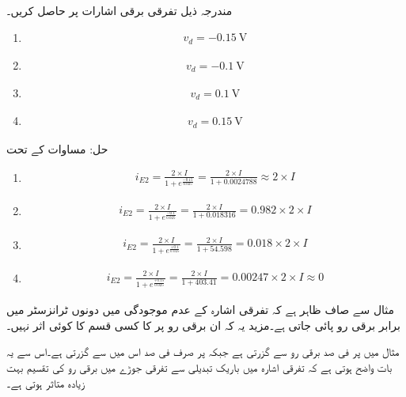  
مندرجہ ذیل تفرقی برقی اشارات پر  حاصل کریں۔
\begin{enumerate}
\item
\begin{align*}
v_d=\SI{-0.15}{\volt}
\end{align*}
\item
\begin{align*}
v_d=\SI{-0.1}{\volt}
\end{align*}
\item
\begin{align*}
v_d=\SI{+0.1}{\volt}
\end{align*}
\item
\begin{align*}
v_d=\SI{+0.15}{\volt}
\end{align*}
\end{enumerate}

حل:	مساوات   کے تحت
\begin{enumerate}
\item
\begin{align*}
i_{E2}=\frac{2 \times I}{1+e^{\frac{-0.15}{0.025}}}=\frac{2 \times I}{1+0.0024788} \approx 2 \times I
\end{align*}
\item
\begin{align*}
i_{E2}=\frac{2 \times I}{1+e^{\frac{-0.1}{0.025}}}=\frac{2 \times I}{1+0.018316} = 0.982 \times  2 \times I
\end{align*}
\item
\begin{align*}
i_{E2}=\frac{2 \times I}{1+e^{\frac{+0.1}{0.025}}}=\frac{2 \times I}{1+54.598} =0.018 \times  2 \times I
\end{align*}
\item
\begin{align*}
i_{E2}=\frac{2 \times I}{1+e^{\frac{+0.15}{0.025}}}=\frac{2 \times I}{1+403.41} =0.00247 \times  2 \times I \approx 0
\end{align*}
\end{enumerate}

مثال   سے صاف ظاہر ہے کہ تفرقی اشارہ کے عدم موجودگی میں دونوں ٹرانزسٹر میں برابر برقی رو پائی جاتی ہے۔مزید یہ کہ ان برقی رو پر   کا کسی قسم کا کوئی اثر نہیں۔

مثال   میں  پر  فی صد برقی رو    سے گزرتی ہے جبکہ  پر صرف   فی صد اس میں سے گزرتی ہے۔اس سے یہ بات واضح ہوتی ہے کہ تفرقی اشارہ میں باریک تبدیلی سے تفرقی جوڑے میں برقی رو کی تقسیم بہت زیادہ متاثر ہوتی ہے۔

